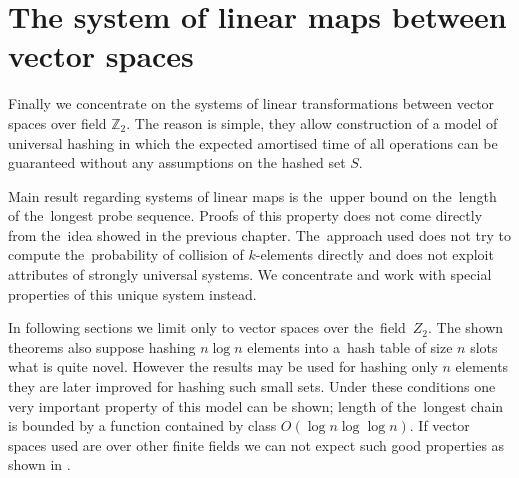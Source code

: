 \chapter{The system of linear maps between vector spaces}
Finally we concentrate on the systems of linear transformations between vector spaces over field $\mathbb{Z}_2$. The reason is simple, they allow construction of a model of universal hashing in which the expected amortised time of all operations can be guaranteed without any assumptions on the hashed set $S$. 

Main result regarding systems of linear maps is the~upper bound on the~length of the~longest probe sequence. Proofs of this property does not come directly from the~idea showed in the previous chapter. The~approach used does not try to compute the~probability of collision of $k$-elements directly and does not exploit attributes of strongly universal systems. We concentrate and work with special properties of this unique system instead.

In following sections we limit only to vector spaces over the~field~$Z_2$. The shown theorems also suppose hashing $n \log n$ elements into a~hash table of size $n$ slots what is quite novel. However the results may be used for hashing only $n$ elements they are later improved for hashing such small sets. Under these conditions one very important property of this model can be shown; length of the~longest chain is bounded by a function contained by class $O(\log n \log \log n)$. If vector spaces used are over other finite fields we can not expect such good properties as shown in \cite{DBLP:journals/jacm/AlonDMPT99}.




